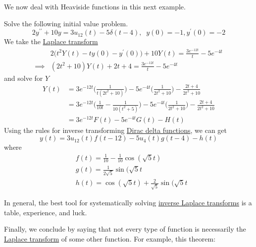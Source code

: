 \documentclass{article}
\newcounter{theorem}[section]
\newcounter{example}[section]
\begin{document}
    We now deal with Heaviside functions in this next example. 
    \begin{example}
      \label{ex:an-initial-value-problem-with-impulse-forcing}
    Solve the following initial value problem. 
    \begin{equation}
      2 y^{\prime\prime} + 10 y = 3 u_{12} (t) - 5 \delta(t - 4), \;\; y(0) = -1, y^\prime (0) = -2
    \end{equation}
    We take the \hyperref[def:laplace-transform]{Laplace transform} 
    \begin{align*}
        & 2 \big( t^2 Y(t) - t y(0) - y^\prime (0) \big) + 10 Y(t) = \frac{3 e^{-12t}}{t} - 5 e^{-4 t} \\
        \implies & (2 t^2 + 10) Y(t) + 2t + 4 = \frac{3 e^{-12t}}{t} - 5 e^{-4t}
    \end{align*}
    and solve for $Y$
    \begin{align*}
        Y(t) & = 3 e^{-12t} \bigg(\frac{1}{t (2t^2 + 10)} \bigg) - 5e^{-4t} \bigg(\frac{1}{2t^2 + 10} \bigg) - \frac{2t+4}{2t^2 + 10} \\
        & = 3 e^{-12t} \bigg(\frac{1}{10t} - \frac{1}{10(t^2+5)} \bigg) - 5e^{-4t} \bigg(\frac{1}{2t^2 + 10} \bigg) - \frac{2t+4}{2t^2 + 10} \\
        & = 3 e^{-12t} F(t) - 5 e^{-4t} G(t) - H(t)
    \end{align*}
    Using the rules for inverse transforming \hyperref[def:dirac-delta-function]{Dirac delta functions}, we can get
    \begin{equation}
      y (t) = 3 u_{12} (t) f(t-12) - 5 u_4 (t) g(t-4) - h(t)
    \end{equation}
    where 
    \begin{align*}
        & f(t) = \frac{1}{10} - \frac{1}{10} \cos{(\sqrt{5} t)} \\
        & g(t) = \frac{1}{2 \sqrt{5}} \sin{(\sqrt{5}t} \\
        & h(t) = \cos{(\sqrt{5}t)} + \frac{2}{\sqrt{5}} \sin{(\sqrt{5}t}
    \end{align*}
    \end{example}

    In general, the best tool for systematically solving \hyperref[def:inverse-laplace-transform]{inverse Laplace transforms} is a table, experience, and luck. 

    Finally, we conclude by saying that not every type of function is necessarily the \hyperref[def:laplace-transform]{Laplace transform} of some other function. For example, this theorem: 
\end{document}
